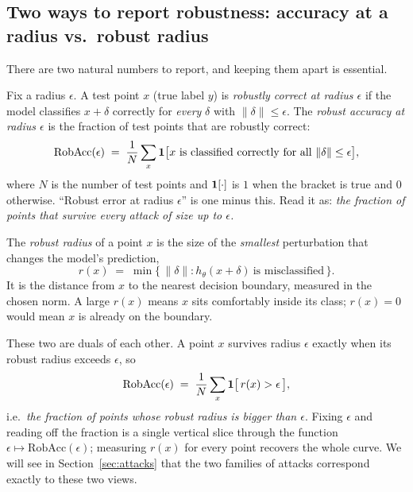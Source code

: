 \subsection{Two ways to report robustness: accuracy at a radius vs.\ robust radius}
\label{sub:robacc-vs-radius}

There are two natural numbers to report, and keeping them apart is essential.

\begin{definition}
Fix a radius $\epsilon$. A test point $x$ (true label $y$) is \emph{robustly correct at radius $\epsilon$} if the model classifies $x+\delta$ correctly for \emph{every} $\delta$ with $\|\delta\|\le\epsilon$. The \emph{robust accuracy at radius $\epsilon$} is the fraction of test points that are robustly correct:
\[
  \mathrm{RobAcc}(\epsilon)
  \;=\; \frac1N \sum_{x} \mathbf 1\big[\text{$x$ is classified correctly for all $\|\delta\|\le\epsilon$}\big],
\]
where $N$ is the number of test points and $\mathbf 1[\cdot]$ is $1$ when the bracket is true and $0$ otherwise. ``Robust error at radius $\epsilon$'' is one minus this. Read it as: \emph{the fraction of points that survive every attack of size up to $\epsilon$.}
\end{definition}

\begin{definition}
The \emph{robust radius} of a point $x$ is the size of the \emph{smallest} perturbation that changes the model's prediction,
\[
  r(x) \;=\; \min\{\,\|\delta\| : h_\theta(x+\delta)\ \text{is misclassified}\,\}.
\]
It is the distance from $x$ to the nearest decision boundary, measured in the chosen norm. A large $r(x)$ means $x$ sits comfortably inside its class; $r(x)=0$ would mean $x$ is already on the boundary.
\end{definition}

These two are duals of each other. A point $x$ survives radius $\epsilon$ exactly when its robust radius exceeds $\epsilon$, so
\begin{equation}
  \label{eq:duality}
  \mathrm{RobAcc}(\epsilon) \;=\; \frac1N\sum_x \mathbf 1\big[\,r(x) > \epsilon\,\big],
\end{equation}
i.e.\ \emph{the fraction of points whose robust radius is bigger than $\epsilon$}. Fixing $\epsilon$ and reading off the fraction is a single vertical slice through the function $\epsilon\mapsto\mathrm{RobAcc}(\epsilon)$; measuring $r(x)$ for every point recovers the whole curve. We will see in Section~\ref{sec:attacks} that the two families of attacks correspond exactly to these two views.

